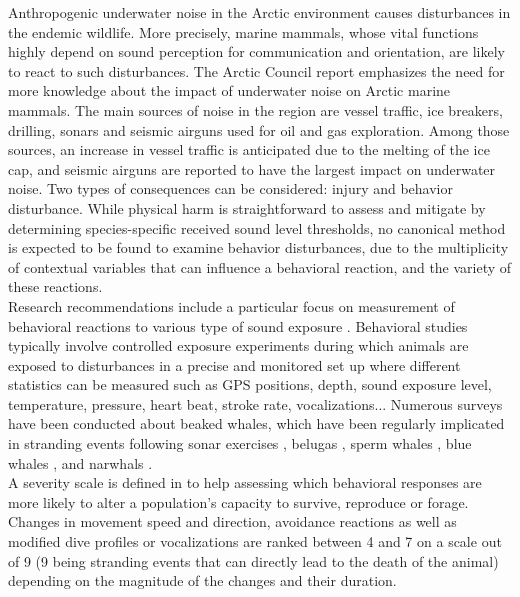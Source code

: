 \documentclass[11pt]{article}
\newcommand {\1}{\mathbb{1}}
\theoremstyle{definition}
\theoremstyle{remark}
\theoremstyle{remark}
\begin{document}
Anthropogenic underwater noise in the Arctic environment causes disturbances in the endemic wildlife. More precisely, marine mammals, whose vital functions highly depend on sound perception for communication and orientation, are likely to react to such disturbances. The Arctic Council report \cite{halliday_underwater_2020} emphasizes the need for more knowledge about the impact of underwater noise on Arctic marine mammals. The main sources of noise in the region are vessel traffic, ice breakers, drilling, sonars and seismic airguns used for oil and gas exploration. Among those sources, an increase in vessel traffic is anticipated due to the melting of the ice cap, and seismic airguns are reported to have the largest impact on underwater noise. Two types of consequences can be considered: injury and behavior disturbance. While physical harm is straightforward to assess and mitigate by determining species-specific received sound level thresholds, no canonical method is expected to be found to examine behavior disturbances, due to the multiplicity of contextual variables that can influence a behavioral reaction, and the variety of these reactions.\\
Research recommendations include a particular focus on measurement of behavioral reactions to various type of sound exposure \cite{southall_marine_2008,southall_marine_2019}. Behavioral studies typically involve controlled exposure experiments during which animals are exposed to disturbances in a precise and monitored set up where different  statistics can be measured such as GPS positions, depth, sound exposure level, temperature, pressure, heart beat, stroke rate, vocalizations... Numerous surveys have been conducted about beaked whales, which have been regularly implicated in stranding events following sonar exercises \cite{tyack_beaked_2011,cioffi_trade-offs_2022}, belugas \cite{martin_exposure_2023}, sperm whales \cite{madsen_quantitative_2006}, blue whales \cite{friedlaender_preymediated_2016}, and narwhals \cite{heide-jorgensen_behavioral_2021,tervo_narwhals_2021}. \\
A severity scale is defined in \cite{southall_marine_2008} to help assessing which behavioral responses are more likely to alter a population's capacity to survive, reproduce or forage. Changes in movement speed and direction, avoidance reactions as well as modified dive profiles or vocalizations  are ranked between 4 and 7 on a scale out of 9 (9 being stranding events that can directly lead to the death of the animal) depending on the magnitude of the changes and their duration.\\
\end{document}
